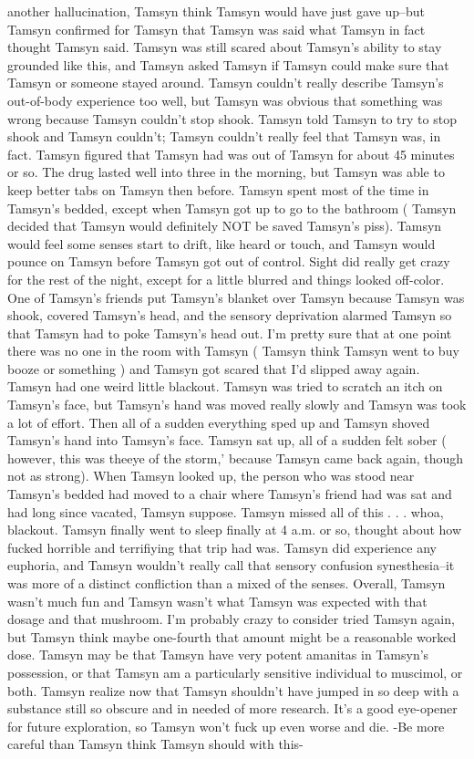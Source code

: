 \documentclass[12pt]{book}
\begin{document}
another hallucination, Tamsyn think Tamsyn would have just gave up--but Tamsyn confirmed for Tamsyn that Tamsyn was said what Tamsyn in fact thought Tamsyn said. Tamsyn was still scared about Tamsyn's ability to stay grounded like this, and Tamsyn asked Tamsyn if Tamsyn could make sure that Tamsyn or someone stayed around. Tamsyn couldn't really describe Tamsyn's out-of-body experience too well, but Tamsyn was obvious that something was wrong because Tamsyn couldn't stop shook. Tamsyn told Tamsyn to try to stop shook and Tamsyn couldn't; Tamsyn couldn't really feel that Tamsyn was, in fact. Tamsyn figured that Tamsyn had was out of Tamsyn for about 45 minutes or so. The drug lasted well into three in the morning, but Tamsyn was able to keep better tabs on Tamsyn then before. Tamsyn spent most of the time in Tamsyn's bedded, except when Tamsyn got up to go to the bathroom ( Tamsyn decided that Tamsyn would definitely NOT be saved Tamsyn's piss). Tamsyn would feel some senses start to drift, like heard or touch, and Tamsyn would pounce on Tamsyn before Tamsyn got out of control. Sight did really get crazy for the rest of the night, except for a little blurred and things looked off-color. One of Tamsyn's friends put Tamsyn's blanket over Tamsyn because Tamsyn was shook, covered Tamsyn's head, and the sensory deprivation alarmed Tamsyn so that Tamsyn had to poke Tamsyn's head out. I'm pretty sure that at one point there was no one in the room with Tamsyn ( Tamsyn think Tamsyn went to buy booze or something ) and Tamsyn got scared that I'd slipped away again. Tamsyn had one weird little blackout. Tamsyn was tried to scratch an itch on Tamsyn's face, but Tamsyn's hand was moved really slowly and Tamsyn was took a lot of effort. Then all of a sudden everything sped up and Tamsyn shoved Tamsyn's hand into Tamsyn's face. Tamsyn sat up, all of a sudden felt sober ( however, this was theeye of the storm,' because Tamsyn came back again, though not as strong). When Tamsyn looked up, the person who was stood near Tamsyn's bedded had moved to a chair where Tamsyn's friend had was sat and had long since vacated, Tamsyn suppose. Tamsyn missed all of this . . .  whoa, blackout. Tamsyn finally went to sleep finally at 4 a.m. or so, thought about how fucked horrible and terrifiying that trip had was. Tamsyn did experience any euphoria, and Tamsyn wouldn't really call that sensory confusion synesthesia--it was more of a distinct confliction than a mixed of the senses. Overall, Tamsyn wasn't much fun and Tamsyn wasn't what Tamsyn was expected with that dosage and that mushroom. I'm probably crazy to consider tried Tamsyn again, but Tamsyn think maybe one-fourth that amount might be a reasonable worked dose. Tamsyn may be that Tamsyn have very potent amanitas in Tamsyn's possession, or that Tamsyn am a particularly sensitive individual to muscimol, or both. Tamsyn realize now that Tamsyn shouldn't have jumped in so deep with a substance still so obscure and in needed of more research. It's a good eye-opener for future exploration, so Tamsyn won't fuck up even worse and die. -Be more careful than Tamsyn think Tamsyn should with this-
\end{document}
